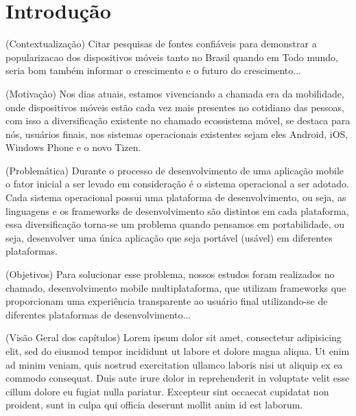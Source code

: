 \chapter{Introdução} %
(Contextualização) Citar pesquisas de fontes confiáveis para demonstrar a
popularizacao dos dispositivos móveis tanto no Brasil quando em Todo mundo,
seria bom também informar o crescimento e o futuro do crescimento...

(Motivação) Nos dias atuais, estamos vivenciando a chamada era da mobilidade, onde dispositivos
móveis estão cada vez mais presentes no cotidiano das pessoas, com isso a
diversificação existente no chamado ecossistema móvel, se destaca para nós,
usuários finais, nos sistemas operacionais existentes sejam eles Android, iOS,
Windows Phone e o novo Tizen.

(Problemática) Durante o processo de desenvolvimento de uma aplicação mobile o
fator inicial a ser levado em consideração é o sistema operacional a ser adotado.
Cada sistema operacional possui uma plataforma de desenvolvimento, ou seja, as
linguagens e os frameworks de desenvolvimento são distintos em cada plataforma,
essa diversificação torna-se um problema quando pensamos em portabilidade,
ou seja, desenvolver uma única aplicação que seja portável (usável) em
diferentes plataformas.

(Objetivos) Para solucionar esse problema, nossos estudos foram realizados no
chamado, desenvolvimento mobile multiplataforma, que utilizam frameworks que
proporcionam uma experiência transparente ao usuário final utilizando-se de
diferentes plataformas de desenvolvimento...

(Visão Geral dos capítulos)
Lorem ipsum dolor sit amet, consectetur adipisicing elit, sed do eiusmod
tempor incididunt ut labore et dolore magna aliqua. Ut enim ad minim veniam,
quis nostrud exercitation ullamco laboris nisi ut aliquip ex ea commodo
consequat. Duis aute irure dolor in reprehenderit in voluptate velit esse
cillum dolore eu fugiat nulla pariatur. Excepteur sint occaecat cupidatat non
proident, sunt in culpa qui officia deserunt mollit anim id est laborum.

